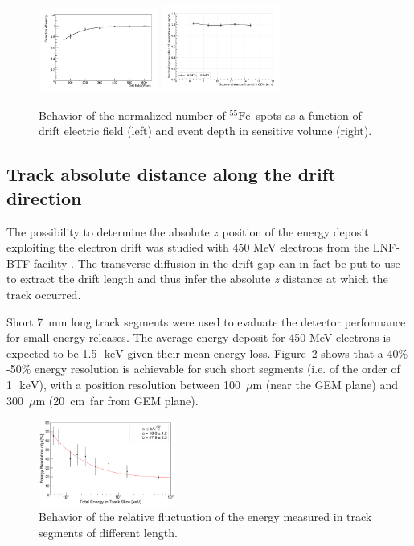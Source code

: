 \documentclass[physics,article,submit,moreauthors,pdftex]{Definitions/mdpi}
\newcommand{\fe}{\ensuremath{^{55}\textrm{Fe}}\xspace}
\newcommand{\keV}{\ensuremath{\,\textrm{keV}}\xspace}
\begin{document}
\begin{figure}[t!]
\centering
\includegraphics[width=0.35\textwidth]{gEff_Edrift.pdf}
\includegraphics[width=0.35\textwidth]{feZscan6040_wo_4.pdf}
\caption{Behavior of the normalized number of \fe~spots as a function of drift electric field (left) and event depth in sensitive volume (right).} 
\label{fig:deteff}
\end{figure}


\subsection{Track absolute distance along the drift direction}\label{sec:track}
The possibility to determine the absolute $z$ position of the energy deposit exploiting the electron drift was studied with 450 MeV electrons from the LNF-BTF facility \cite{bib:lemon_btf}. The  transverse diffusion in the drift gap can in fact be put to use to extract the drift length and thus infer the absolute {\it z} distance at which the track occurred. 

Short 7~mm long track segments were used to evaluate the detector performance for small energy releases. The average energy deposit for 450 MeV electrons is expected to be 1.5~\keV given their mean energy loss. Figure~\ref{fig:eres} shows that a 40$\%$-50$\%$ energy resolution is achievable for such short segments  (i.e. of the order of 1~\keV), with a position resolution between 100~$\mu$m (near the GEM plane) and 300~$\mu$m (20~cm~far from GEM plane).

\begin{figure}[t!]
\centering
\includegraphics[width=0.40\textwidth]{EResBTF.pdf}
\caption{Behavior of the relative fluctuation of the energy measured in track segments of different length.} 
\label{fig:eres}
\end{figure}
\end{document}
